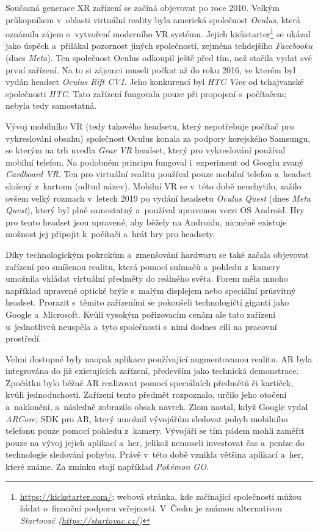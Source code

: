 Současná generace XR zařízení se začíná objevovat po roce 2010. Velkým průkopníkem v~oblasti virtuální reality byla americká společnost \textit{Oculus}, která oznámila zájem o~vytvoření moderního VR systému. Jejich kickstarter\footnote{\url{https://kickstarter.com/}; webová stránka, kde začínající společnosti můžou žádat o~finanční podporu veřejnosti. V~Česku je známou alternativou \em Startovač (\url{https://startovac.cz/})} se ukázal jako úspěch a~přilákal pozornost jiných společností, zejména tehdejšího \textit{Facebooku} (dnes \textit{Meta}). Ten společnost Oculus odkoupil ještě před tím, než stačila vydat své první zařízení. Na to si zájemci museli počkat až do roku 2016, ve kterém byl vydán headset \textit{Oculus Rift CV1}. Jeho konkurencí byl \textit{HTC Vive} od tchajvanské společnosti \textit{HTC}. Tato zařízení fungovala pouze při propojení s~počítačem; nebyla tedy samostatná. \cite{otechnice_3}

Vývoj mobilního VR (tedy takového headsetu, který nepotřebuje počítač pro vykreslování obsahu) společnost Oculus konala za podpory korejského Samsungu, se kterým na trh uvedla \textit{Gear VR} \poml headset, který pro vykreslování používal mobilní telefon. Na podobném principu fungoval i~experiment od Googlu zvaný \textit{Cardboard VR}. Ten pro virtuální realitu používal pouze mobilní telefon a~headset složený z~kartonu (odtud název). Mobilní VR se v~této době neuchytilo, zažilo ovšem velký rozmach v~letech 2019 po vydání headsetu \textit{Oculus Quest} (dnes \textit{Meta Quest}), který byl plně samostatný a~používal upravenou verzi OS Android. Hry pro tento headset jsou upravené, aby běžely na Androidu, nicméně existuje možnost jej připojit k~počítači a~hrát hry pro  headsety. \cite{otechnice_3}

Díky technologickým pokrokům a~zmenšování hardwaru se také začala objevovat zařízení pro smíšenou realitu, která pomocí snímačů a~pohledu z~kamery umožnila vkládat virtuální předměty do reálného světa. Forem měla mno\-ho \poml například upravené optické brýle s~malým displejem nebo speciální průsvitný headset. Prorazit s~těmito zařízeními se pokoušeli technologičtí giganti jako Google a~Microsoft. Kvůli vysokým pořizovacím cenám ale tato zařízení u~jednotlivců neuspěla a~tyto společnosti s~nimi dodnes cílí na pracovní prostředí. \cite{google_glass_mobilenet}

Velmi dostupné byly naopak aplikace používající augmentovanou realitu. AR byla integrována do již existujících zařízení, především jako technická demonstrace. Zpočátku bylo běžné AR realizovat pomocí speciálních předmětů či kartiček, kvůli jednoduchosti. Zařízení tento předmět rozpoznalo, určilo jeho otočení a~naklonění, a~následně zobrazilo obsah navrch. Zlom nastal, když Google vydal \textit{ARCore}, \gls{SDK} pro AR, který umožnil vývojářům sledovat pohyb mobilního telefonu pouze pomocí pohledu z~kamery. Vývojáři se tím pádem mohli zaměřit pouze na vývoj jejich aplikací a~her, jelikož nemuseli investovat čas a~peníze do technologie sledování pohybu. Právě v~této době vznikla většina aplikací a~her, které známe. Za zmínku stojí například \textit{Pokémon GO}. \cite{enwiki:1182789097}

